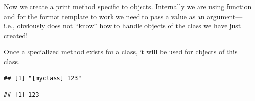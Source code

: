 \documentclass[krantz2]{krantz}\usepackage{knitr}
\begin{document}
Now we create a print method specific to  objects. Internally we are using function  and for the format template to work we need to pass a  value as an argument---i.e., obviously  does not ``know'' how to handle objects of the class we have just created!

\begin{knitrout}\footnotesize
{}\color{fgcolor}
\end{knitrout}

Once a specialized method exists for a class, it will be used for objects of this class.

\begin{knitrout}\footnotesize
{}\color{fgcolor}\begin{kframe}
\begin{alltt}
\end{alltt}
\begin{verbatim}
## [1] "[myclass] 123"
\end{verbatim}
\begin{alltt}
\hlstd{(}
\end{alltt}
\begin{verbatim}
## [1] 123
\end{verbatim}
\end{kframe}
\end{knitrout}
\end{document}
